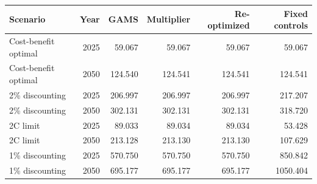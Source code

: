 \begin{tabular}{lrrrrr}
\toprule
Scenario & Year & GAMS & Multiplier & Re-optimized & Fixed controls \\
\midrule
Cost-benefit optimal & 2025 & 59.067 & 59.067 & 59.067 & 59.067 \\
Cost-benefit optimal & 2050 & 124.540 & 124.541 & 124.541 & 124.541 \\
2\% discounting & 2025 & 206.997 & 206.997 & 206.997 & 217.207 \\
2\% discounting & 2050 & 302.131 & 302.131 & 302.131 & 318.720 \\
2\textdegree{}C limit & 2025 & 89.033 & 89.034 & 89.034 & 53.428 \\
2\textdegree{}C limit & 2050 & 213.128 & 213.130 & 213.130 & 107.629 \\
1\% discounting & 2025 & 570.750 & 570.750 & 570.750 & 850.842 \\
1\% discounting & 2050 & 695.177 & 695.177 & 695.177 & 1050.404 \\
\bottomrule
\end{tabular}
